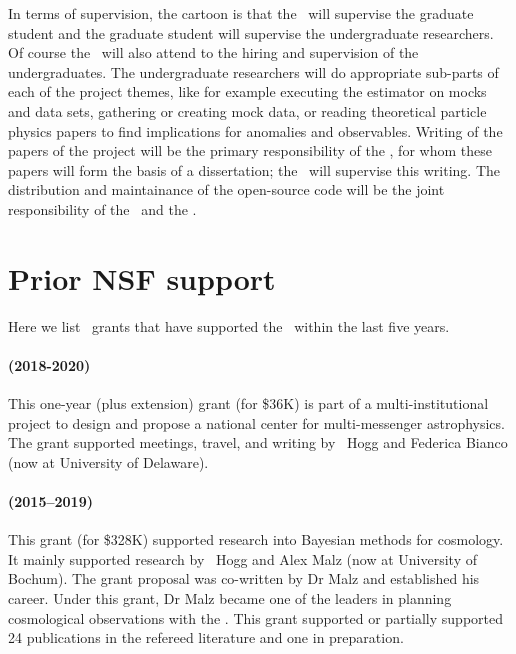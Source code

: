 \documentclass[12pt, fullpage, letterpaper]{article}
\begin{document}
In terms of supervision, the cartoon is that the \PI\ will supervise the graduate student and the graduate student will supervise the undergraduate researchers.
Of course the \PI\ will also attend to the hiring and supervision of the undergraduates.
The undergraduate researchers will do appropriate sub-parts of each of the project themes, like for example executing the estimator on mocks and data sets, gathering or creating mock data, or reading theoretical particle physics papers to find implications for anomalies and observables.
Writing of the papers of the project will be the primary responsibility of the \GRA, for whom these papers will form the basis of a dissertation; the \PI\ will supervise this writing.
The distribution and maintainance of the open-source code will be the joint responsibility of the \PI\ and the \GRA.

\section{Prior NSF support}

Here we list \NSF\ grants that have supported the \PI\ within the last five years.

\paragraph{
 (2018-2020)}
This one-year (plus extension) grant (for \$36K) is part of a multi-institutional project
to design and propose a national center for multi-messenger astrophysics. The grant supported
meetings, travel, and writing by \PI\ Hogg and Federica Bianco (now at University of Delaware).

\paragraph{
(2015--2019)} This grant (for \$328K) supported research into Bayesian
methods for cosmology. It mainly supported research by \PI\ Hogg and
Alex Malz (now at University of Bochum). The grant proposal was co-written
by Dr Malz and established his career.
Under this grant, Dr Malz became one of the leaders in planning cosmological
observations with the .
This grant supported or partially supported 24 publications
in the refereed literature and one in preparation.
\end{document}
